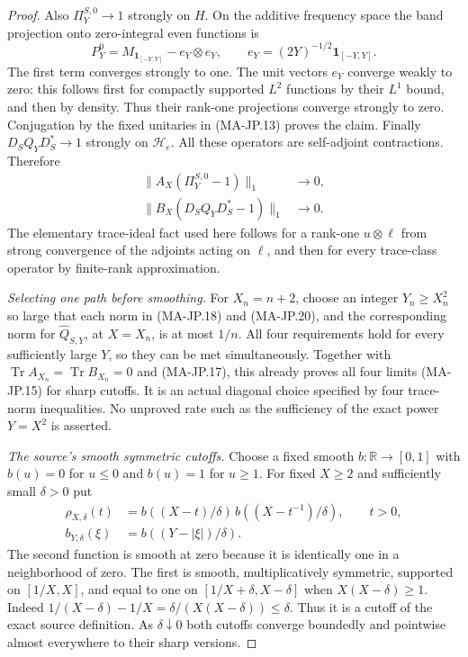 \begin{proof}
Also $\Pi_Y^{S,0}\to1$ strongly on $H$.
On the additive frequency space the band projection
onto zero-integral even functions is
\[
 P_Y^0=M_{\mathbf1_{[-Y,Y]}}-e_Y\otimes e_Y,\qquad
              e_Y=(2Y)^{-1/2}\mathbf1_{[-Y,Y]} .
 \tag{MA-JP.19}
\]
The first term converges strongly to one.
The unit vectors $e_Y$ converge weakly to zero:
this follows first for compactly supported $L^2$
functions by their $L^1$ bound, and then by density.
Thus their rank-one projections converge strongly
to zero.  Conjugation by the fixed unitaries in
(MA-JP.13) proves the claim.
Finally $D_SQ_YD_S^*\to1$ strongly on $\mathscr H_e$.
All these operators are self-adjoint contractions.
Therefore
\[
 \begin{aligned}
 \|A_X(\Pi_Y^{S,0}-1)\|_1&\longrightarrow0,\\
 \|B_X(D_SQ_YD_S^*-1)\|_1&\longrightarrow0.
 \end{aligned}
 \tag{MA-JP.20}
\]
The elementary trace-ideal fact used here follows
for a rank-one $u\otimes\ell$ from strong convergence
of the adjoints acting on $\ell$, and then for every
trace-class operator by finite-rank approximation.

\emph{Selecting one path before smoothing.}
For $X_n=n+2$, choose an integer $Y_n\ge X_n^2$
so large that each norm in (MA-JP.18) and
(MA-JP.20), and the corresponding norm for
$\widehat Q_{S,Y}$, at $X=X_n$, is at most $1/n$.
All four requirements hold for every sufficiently
large $Y$, so they can be met simultaneously.
Together with $\operatorname{Tr}A_{X_n}
=\operatorname{Tr}B_{X_n}=0$ and (MA-JP.17),
this already proves all four limits (MA-JP.15)
for sharp cutoffs.
It is an actual diagonal choice specified by four
trace-norm inequalities.  No unproved rate such as
the sufficiency of the exact power $Y=X^2$ is asserted.

\emph{The source's smooth symmetric cutoffs.}
Choose a fixed smooth $b:\mathbb R\to[0,1]$ with
$b(u)=0$ for $u\le0$ and $b(u)=1$ for $u\ge1$.
For fixed $X\ge2$ and sufficiently small $\delta>0$
put
\[
 \begin{aligned}
 \rho_{X,\delta}(t)
  &=b((X-t)/\delta)\,b((X-t^{-1})/\delta),\qquad t>0,\\
 b_{Y,\delta}(\xi)
  &=b((Y-|\xi|)/\delta).
 \end{aligned}
 \tag{MA-JP.21}
\]
The second function is smooth at zero because it
is identically one in a neighborhood of zero.
The first is smooth, multiplicatively symmetric,
supported on $[1/X,X]$, and equal to one on
$[1/X+\delta,X-\delta]$ when $X(X-\delta)\ge1$.
Indeed $1/(X-\delta)-1/X
=\delta/(X(X-\delta))\le\delta$.
Thus it is a cutoff of the exact source definition.
As $\delta\downarrow0$ both cutoffs converge boundedly
and pointwise almost everywhere to their sharp versions.


\end{proof}
